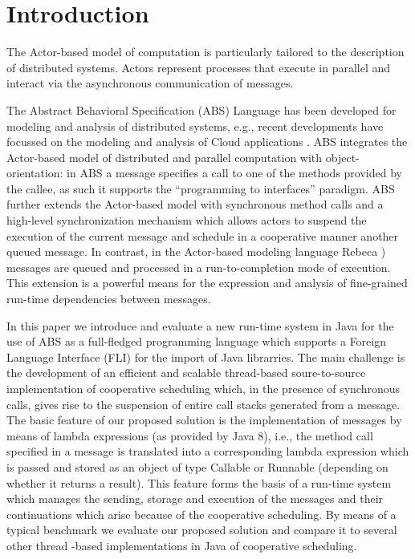 \section{Introduction}

The Actor-based model of computation \cite{Agha} is particularly tailored to the description of distributed systems.  Actors represent processes that execute in parallel and interact via the asynchronous communication of messages.


The  Abstract Behavioral Specification (ABS) \cite{abs}  Language has been developed
for modeling and analysis of distributed systems, e.g., recent developments
have focussed on the modeling and analysis of Cloud applications \cite{Albert}.
 ABS integrates the Actor-based model of distributed and parallel computation with object-orientation:
in ABS a message specifies a  call to one of the methods provided by the callee,
as such it supports the ``programming to interfaces'' paradigm.
ABS further  extends the Actor-based model with  synchronous method calls and a high-level synchronization mechanism which allows actors to suspend the
execution of the current message and schedule in a cooperative manner another
queued message. 
In contrast, in the Actor-based modeling language Rebeca \cite{Sirjani})
messages are queued and processed in a run-to-completion mode of execution.
This  extension  is a powerful means for the expression and analysis
of fine-grained run-time dependencies between messages.



In this paper we introduce  and evaluate a new run-time system in Java for  the use of ABS as a full-fledged programming language which supports a Foreign Language Interface (FLI) for the import of Java librarries. 
The main challenge is the development of an efficient and scalable  thread-based soure-to-source implementation of cooperative scheduling which, in the presence of synchronous calls,   gives rise to the suspension of  entire call stacks generated
from a message.
The basic feature of our proposed solution is the implementation of messages by means of lambda expressions (as provided by Java 8), i.e., the method call specified in a message
is translated into a corresponding lambda expression which is passed and stored as
an object of type Callable or Runnable (depending on whether it returns  a result).
This  feature forms  the basis of a run-time system which manages
the sending, storage and execution of  the messages and their continuations
which arise because of the cooperative scheduling.
By means of a typical benchmark we evaluate our proposed solution and compare it
to several other thread -based implementations in Java of cooperative scheduling.

